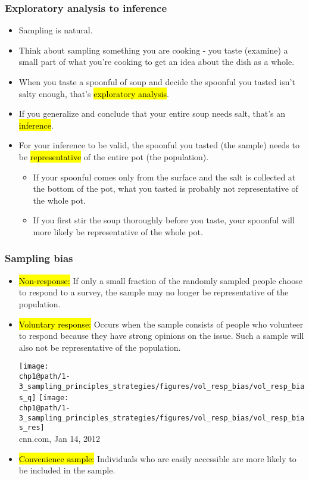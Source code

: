 \documentclass[slidestop,compress,mathserif]{beamer}
\makeatletter
\def\chp1@path{../../Chp 1}
\makeatother
\begin{document}
\begin{frame}
\frametitle{Exploratory analysis to inference}

	\begin{itemize}
		\item Sampling is natural.
		\pause
		\item Think about sampling something you are cooking - you taste (examine) a small part of what you're cooking to get an idea about the dish as a whole.
		\pause
		\item When you taste a spoonful of soup and decide the spoonful you tasted isn't salty enough, that's \hl{exploratory analysis}.
		\pause
		\item If you generalize and conclude that your entire soup needs salt, that's an \hl{inference}.
		\pause
		\item For your inference to be valid, the spoonful you tasted (the sample) needs to be \hl{representative} of the entire pot (the population).

		\begin{itemize}
			\item If your spoonful comes only from the surface and the salt is collected at the bottom of the pot, what you tasted is probably not representative of the whole pot.
			\item If you first stir the soup thoroughly before you taste, your spoonful will more likely be representative of the whole pot.
		\end{itemize}

	\end{itemize}

\end{frame}


\begin{frame}
	\frametitle{Sampling bias}

	\begin{itemize}
		\item \hl{Non-response:} If only a small fraction of the randomly sampled people choose to respond to a survey, the sample may no longer be representative of the population.
		\pause
		\item \hl{Voluntary response:} Occurs when the sample consists of people who volunteer to respond because they have strong opinions on the issue. Such a sample will also not be representative of the population.
		\pause
		\begin{center}
		\texttt{[image: \\chp1@path/1-3\_sampling\_principles\_strategies/figures/vol\_resp\_bias/vol\_resp\_bias\_q]}\pause
		\texttt{[image: \\chp1@path/1-3\_sampling\_principles\_strategies/figures/vol\_resp\_bias/vol\_resp\_bias\_res]} \\
		{\tiny cnn.com, Jan 14, 2012}
		\end{center}
		\pause
		\item \hl{Convenience sample:} Individuals who are easily accessible are more likely to be included in the sample.

	\end{itemize}

\end{frame}
\end{document}
